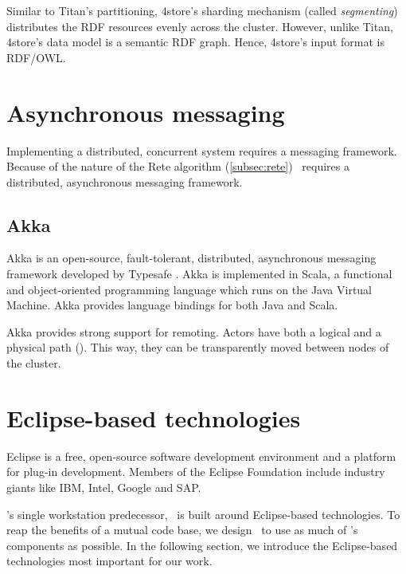 Similar to Titan's partitioning, 4store's sharding mechanism (called \emph{segmenting}) distributes the RDF resources evenly across the cluster. However, unlike Titan, 4store's data model is a semantic RDF graph. Hence, 4store's input format is RDF/OWL.


\section{Asynchronous messaging}

Implementing a distributed, concurrent system requires a messaging framework. Because of the nature of the Rete algorithm (\ref{subsec:rete}) \iqd\ requires a distributed, asynchronous messaging framework.

\subsection{Akka}


Akka is an open-source, fault-tolerant, distributed, asynchronous messaging framework developed by Typesafe . Akka is implemented in Scala, a functional and object-oriented programming language which runs on the Java Virtual Machine. Akka provides language bindings for both Java and Scala.


Akka provides strong support for remoting. Actors have both a logical and a physical path (). This way, they can be transparently moved between nodes of the cluster.


\section{Eclipse-based technologies}

Eclipse is a free, open-source software development environment and a platform for plug-in development. Members of the Eclipse Foundation include industry giants like IBM, Intel, Google and SAP.

\iqd's single workstation predecessor, \eiq\ is built around Eclipse-based technologies. To reap the benefits of a mutual code base, we design \iqd\ to use as much of \eiq's components as possible. In the following section, we introduce the Eclipse-based technologies most important for our work.  

